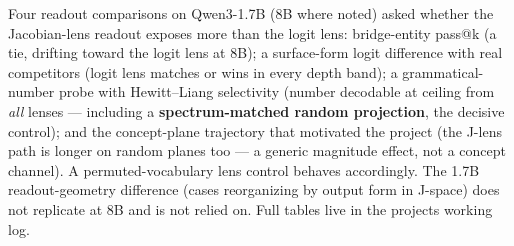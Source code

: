 Four readout comparisons on Qwen3-1.7B (8B where noted) asked whether
the Jacobian-lens readout exposes more than the logit lens:
bridge-entity pass@k (a tie, drifting toward the logit lens at 8B); a
surface-form logit difference with real competitors (logit lens matches
or wins in every depth band); a grammatical-number probe with
Hewitt--Liang selectivity (number decodable at ceiling from \emph{all}
lenses --- including a \textbf{spectrum-matched random projection}, the
decisive control); and the concept-plane trajectory that motivated the
project (the J-lens path is longer on random planes too --- a generic
magnitude effect, not a concept channel). A permuted-vocabulary lens
control behaves accordingly. The 1.7B readout-geometry difference (cases
reorganizing by output form in J-space) does not replicate at 8B and is
not relied on. Full tables live in the project\textquotesingle s working
log.



